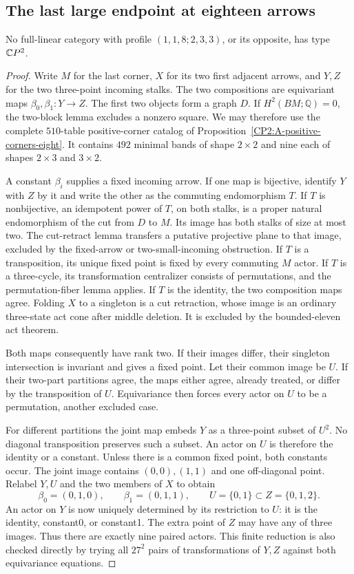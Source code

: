 \subsection{The last large endpoint at eighteen arrows}

\begin{theorem}
\label{CP2:A-extreme-eight-two-three-three}
No full-linear category with profile $(1,1,8;2,3,3)$,
or its opposite, has type $\mathbb{C}P^2$.
\end{theorem}
\begin{proof}
Write $M$ for the last corner, $X$ for its two first
adjacent arrows, and $Y,Z$ for the two three-point
incoming stalks. The two compositions are equivariant
maps $\beta_0,\beta_1:Y\to Z$. The first two objects
form a graph $D$. If $H^2(BM;\mathbb Q)=0$, the
two-block lemma excludes a nonzero square. We may
therefore use the complete $510$-table positive-corner
catalog of Proposition~\ref{CP2:A-positive-corners-eight}.
It contains $492$ minimal bands of shape $2\times2$
and nine each of shapes $2\times3$ and $3\times2$.

A constant $\beta_i$ supplies a fixed incoming arrow.
If one map is bijective, identify $Y$ with $Z$ by it
and write the other as the commuting endomorphism $T$.
If $T$ is nonbijective, an idempotent power of $T$,
on both stalks, is a proper natural endomorphism of
the cut from $D$ to $M$. Its image has both stalks
of size at most two. The cut-retract lemma transfers
a putative projective plane to that image, excluded
by the fixed-arrow or two-small-incoming obstruction.
If $T$ is a transposition, its unique fixed point
is fixed by every commuting $M$ actor. If $T$ is a
three-cycle, its transformation centralizer consists
of permutations, and the permutation-fiber lemma
applies. If $T$ is the identity, the two composition
maps agree. Folding $X$ to a singleton is a cut
retraction, whose image is an ordinary three-state
act cone after middle deletion. It is excluded by
the bounded-eleven act theorem.

Both maps consequently have rank two. If their images
differ, their singleton intersection is invariant and
gives a fixed point. Let their common image be $U$.
If their two-part partitions agree, the maps either
agree, already treated, or differ by the transposition
of $U$. Equivariance then forces every actor on $U$
to be a permutation, another excluded case.

For different partitions the joint map embeds $Y$
as a three-point subset of $U^2$. No diagonal
transposition preserves such a subset. An actor on
$U$ is therefore the identity or a constant. Unless
there is a common fixed point, both constants occur.
The joint image contains $(0,0),(1,1)$ and one
off-diagonal point. Relabel $Y,U$ and the two members
of $X$ to obtain
\[
 \beta_0=(0,1,0),\qquad \beta_1=(0,1,1),
 \qquad U=\{0,1\}\subset Z=\{0,1,2\}.
\]
An actor on $Y$ is now uniquely determined by its
restriction to $U$: it is the identity, constant0,
or constant1. The extra point of $Z$ may have any
of three images. Thus there are exactly nine paired
actors. This finite reduction is also checked directly
by trying all $27^2$ pairs of transformations of $Y,Z$
against both equivariance equations.


\end{proof}
